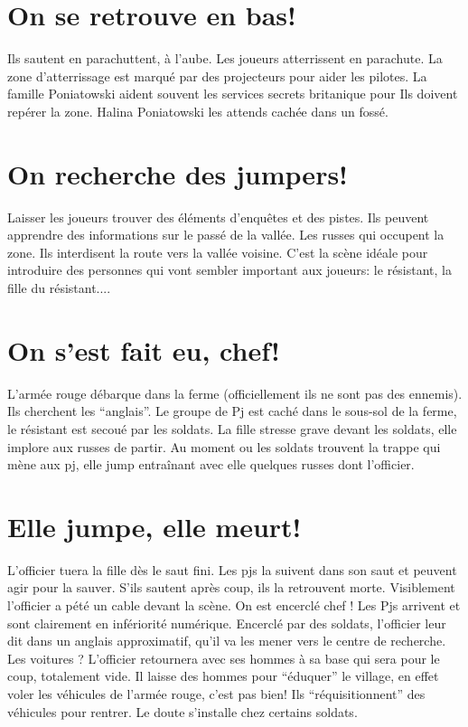 \documentclass[oneside,12pt]{book}
\begin{document}
\begin{flushleft}
\section{On se retrouve en bas!}
Ils sautent en parachuttent, à l’aube. 
Les joueurs atterrissent en parachute. La zone d'atterrissage est marqué par des projecteurs pour aider les pilotes. La famille 
Poniatowski aident souvent les services secrets britanique pour 
 Ils doivent repérer la zone. 
Halina Poniatowski les attends cachée dans un fossé. 


\section{On recherche des jumpers!}
Laisser les joueurs trouver des éléments d’enquêtes et des pistes. 
Ils peuvent apprendre des informations sur le passé de la vallée. 
Les russes qui occupent la zone. Ils interdisent la route vers la vallée voisine. 
C’est la scène idéale pour introduire des personnes qui vont sembler important aux joueurs: le résistant, la fille du résistant....

\section{On s’est fait eu, chef!}
L’armée rouge débarque dans la ferme (officiellement ils ne sont pas des ennemis). 
Ils cherchent les “anglais”. 
Le groupe de Pj est caché dans le sous-sol de la ferme, le résistant est secoué par les soldats. 
La fille stresse grave devant les soldats, elle implore aux russes de partir. 
Au moment ou les soldats trouvent la trappe qui mène aux pj, elle jump entraînant avec elle quelques russes dont l’officier.


\section{Elle jumpe, elle meurt!}
L’officier tuera la fille dès le saut fini. Les pjs la suivent dans son saut et peuvent agir pour la sauver. 
S’ils sautent après coup, ils la retrouvent morte. Visiblement l’officier a pété un cable devant la scène.
On est encerclé chef !
Les Pjs arrivent et sont clairement en infériorité numérique. Encerclé par des soldats, l’officier leur dit dans un anglais approximatif, qu’il va les mener vers le centre de recherche.
Les voitures ?
L’officier retournera avec ses hommes à sa base qui sera pour le coup, totalement vide. 
Il laisse des hommes pour “éduquer” le village, en effet voler les véhicules de l’armée rouge, c’est pas bien!  
Ils “réquisitionnent” des véhicules pour rentrer. 
Le doute s’installe chez certains soldats.


\end{flushleft}
\end{document}
